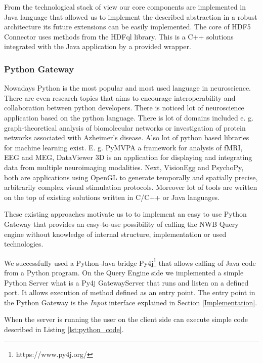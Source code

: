 \documentclass[utf8]{frontiersSCNS} %
\begin{document}
From the technological stack of view our core components are implemented in Java language that allowed us to implement the described abstraction in a robust architecture its future extensions can be easily implemented. The core of HDF5 Connector uses methods from the HDFql library. This is a C++ solutions integrated with the Java application by a provided wrapper.

\subsubsection{Python Gateway}
\label{Python_Gateway}

Nowadays Python is the most popular and most used language in neuroscience. There are even research topics \citep{10.3389/fninf.2015.00011} that aims to encourage interoperability and collaboration between python developers. There is noticed lot of neuroscience application based on the python language. There is lot of domains included e. g. graph-theoretical analysis of biomolecular networks or investigation of protein networks associated with Azheimer's disease. Also lot of python based libraries for machine learning exist. E. g. PyMVPA a  framework for analysis of fMRI, EEG and MEG, DataViewer 3D is an application for displaying and integrating data from multiple neuroimaging modalities. Next, VisionEgg and PsychoPy, both are applications using OpenGL to generate temporally and spatially precise, arbitrarily complex visual stimulation protocols.  Moreover lot of tools are written on the top of existing solutions written in C/C++ or Java languages. 

These existing approaches motivate us to to implement an easy to use Python Gateway that provides an easy-to-use possibility of calling the NWB Query engine without knowledge of internal structure, implementation or used technologies. 

We successfully used a Python-Java bridge Py4j\footnote{https://www.py4j.org/} that allows calling of Java code from a Python program. On the Query Engine side we implemented a simple Python Server what is a Py4j GatewayServer that runs and listen on a defined port. It allows execution of method defined as an entry point. The entry point in the Python Gateway is the \emph{Input} interface explained in Section \ref{Implementation}. 

When the server is running the user on the client side can execute simple code described in Listing \ref{lst:python_code}.
\end{document}
